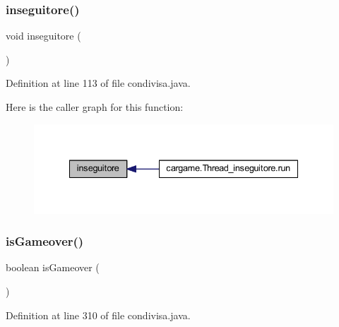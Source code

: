 \subsubsection{\texorpdfstring{inseguitore()}{inseguitore()}}
{\footnotesize\ttfamily void inseguitore (\begin{DoxyParamCaption}{ }\end{DoxyParamCaption})}



Definition at line 113 of file condivisa.\+java.

Here is the caller graph for this function\+:
\nopagebreak
\begin{figure}[H]
\begin{center}
\leavevmode
\includegraphics[width=335pt]{classcargame_1_1condivisa_a54112d941742c218419e82d00f4d3490_icgraph}
\end{center}
\end{figure}
\mbox{\label{classcargame_1_1condivisa_ae61fc75224a904d7267bf6637a5afce2}} 
\subsubsection{\texorpdfstring{is\+Gameover()}{isGameover()}}
{\footnotesize\ttfamily boolean is\+Gameover (\begin{DoxyParamCaption}{ }\end{DoxyParamCaption})}



Definition at line 310 of file condivisa.\+java.

